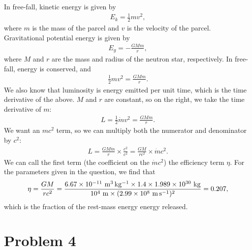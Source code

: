 \documentclass[11pt,letterpaper]{article}
\begin{document}
In free-fall, kinetic energy is given by 
\begin{align*}
    E_k = \frac{1}{2}mv^2,
\end{align*}
where $m$ is the mass of the parcel and $v$ is the velocity of the parcel. Gravitational potential energy is given by 
\begin{align*}
    E_g = -\frac{GMm}{r},
\end{align*}
where $M$ and $r$ are the mass and radius of the neutron star, respectively. In free-fall, energy is conserved, and 
\begin{align*}
    \frac{1}{2}mv^2 = \frac{GMm}{r}.
\end{align*}
We also know that luminosity is energy emitted per unit time, which is the time derivative of the above. $M$ and $r$ are constant, so on the right, we take the time derivative of $m$:
\begin{align*}
    L = \frac{1}{2}\dot{m}v^2 = \frac{GM\dot{m}}{r}.
\end{align*}
We want an $mc^2$ term, so we can multiply both the numerator and denominator by $c^2$:
\begin{align*}
    L = \frac{GM\dot{m}}{r}\times \frac{c^2}{c^2} = \frac{GM}{rc^2}\times \dot{m}c^2.
\end{align*}
We can call the first term (the coefficient on the $\dot{m}c^2$) the efficiency term $\eta$. For the parameters given in the question, we find that 
\begin{align*}
    \eta = \frac{GM}{rc^2} = \frac{6.67\times 10^{-11}~{\rm m^3\,kg^{-1}\times 1.4\times 1.989\times 10^{30}~{\rm kg}}}{10^4~{\rm m}\times (2.99\times 10^{8}~{\rm m\,s^{-1}})^2} = 0.207,
\end{align*}
which is the fraction of the rest-mass energy energy released. 

\section*{Problem 4}
\end{document}
